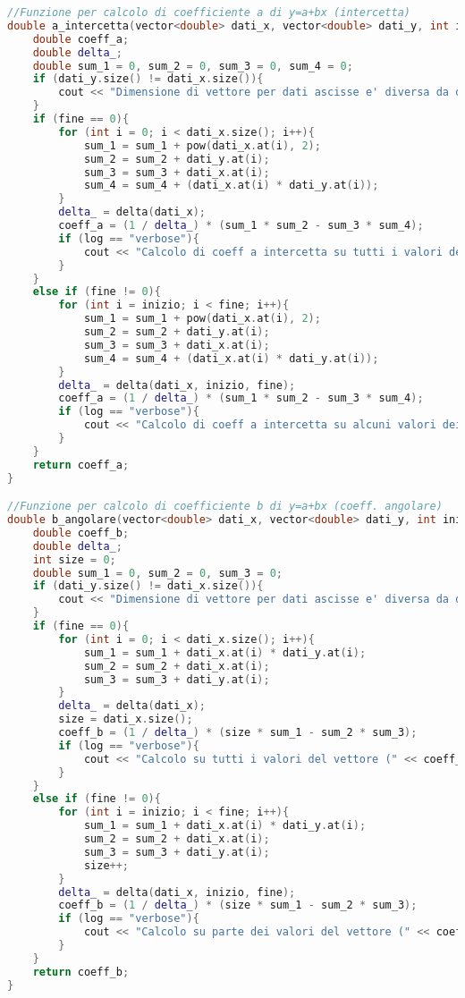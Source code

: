 \documentclass[a4paper,11pt,oneside]{article}
\begin{document}
\begin{lstlisting}[language=C++, label=lst:statistica.h, caption=statistica.h]
//Funzione per calcolo di coefficiente a di y=a+bx (intercetta)
double a_intercetta(vector<double> dati_x, vector<double> dati_y, int inizio = 0, int fine = 0, string log = ""){
    double coeff_a;
    double delta_;
    double sum_1 = 0, sum_2 = 0, sum_3 = 0, sum_4 = 0;
    if (dati_y.size() != dati_x.size()){
        cout << "Dimensione di vettore per dati ascisse e' diversa da dimensione vettore dati ordinate" << endl;
    }
    if (fine == 0){
        for (int i = 0; i < dati_x.size(); i++){
            sum_1 = sum_1 + pow(dati_x.at(i), 2);
            sum_2 = sum_2 + dati_y.at(i);
            sum_3 = sum_3 + dati_x.at(i);
            sum_4 = sum_4 + (dati_x.at(i) * dati_y.at(i));
        }
        delta_ = delta(dati_x);
        coeff_a = (1 / delta_) * (sum_1 * sum_2 - sum_3 * sum_4);
        if (log == "verbose"){
            cout << "Calcolo di coeff a intercetta su tutti i valori dei vettori forniti (" << coeff_a << ")" << endl;
        }
    }
    else if (fine != 0){
        for (int i = inizio; i < fine; i++){
            sum_1 = sum_1 + pow(dati_x.at(i), 2);
            sum_2 = sum_2 + dati_y.at(i);
            sum_3 = sum_3 + dati_x.at(i);
            sum_4 = sum_4 + (dati_x.at(i) * dati_y.at(i));
        }
        delta_ = delta(dati_x, inizio, fine);
        coeff_a = (1 / delta_) * (sum_1 * sum_2 - sum_3 * sum_4);
        if (log == "verbose"){
            cout << "Calcolo di coeff a intercetta su alcuni valori dei vettori forniti (" << coeff_a << ")" << endl;
        }
    }
    return coeff_a;
}

//Funzione per calcolo di coefficiente b di y=a+bx (coeff. angolare)
double b_angolare(vector<double> dati_x, vector<double> dati_y, int inizio = 0, int fine = 0, string log = ""){
    double coeff_b;
    double delta_;
    int size = 0; 
    double sum_1 = 0, sum_2 = 0, sum_3 = 0;
    if (dati_y.size() != dati_x.size()){
        cout << "Dimensione di vettore per dati ascisse e' diversa da dimensione vettore dati ordinate";
    }
    if (fine == 0){
        for (int i = 0; i < dati_x.size(); i++){
            sum_1 = sum_1 + dati_x.at(i) * dati_y.at(i);
            sum_2 = sum_2 + dati_x.at(i);
            sum_3 = sum_3 + dati_y.at(i);
        }
        delta_ = delta(dati_x);
        size = dati_x.size();
        coeff_b = (1 / delta_) * (size * sum_1 - sum_2 * sum_3);
        if (log == "verbose"){
            cout << "Calcolo su tutti i valori del vettore (" << coeff_b << ")" << endl;
        }
    }
    else if (fine != 0){
        for (int i = inizio; i < fine; i++){
            sum_1 = sum_1 + dati_x.at(i) * dati_y.at(i);
            sum_2 = sum_2 + dati_x.at(i);
            sum_3 = sum_3 + dati_y.at(i);
            size++;
        }
        delta_ = delta(dati_x, inizio, fine);
        coeff_b = (1 / delta_) * (size * sum_1 - sum_2 * sum_3);
        if (log == "verbose"){
            cout << "Calcolo su parte dei valori del vettore (" << coeff_b << ")" << endl;
        }
    }
    return coeff_b;
}


\end{lstlisting}
\end{document}
